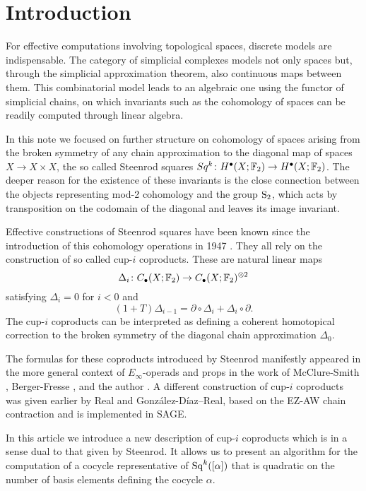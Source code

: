 
\section{Introduction}

For effective computations involving topological spaces, discrete models are indispensable.
The category of simplicial complexes models not only spaces but, through the simplicial approximation theorem, also continuous maps between them.
This combinatorial model leads to an algebraic one using the functor of simplicial chains, on which invariants such as the cohomology of spaces can be readily computed through linear algebra.

In this note we focused on further structure on cohomology of spaces arising from the broken symmetry of any chain approximation to the diagonal map of spaces $X \to X \times X$, the so called Steenrod squares $Sq^k \colon H^\bullet(X; \F_2) \to H^\bullet(X; \F_2)$.
The deeper reason for the existence of these invariants is the close connection between the objects representing mod-2 cohomology and the group $\S_2$, which acts by transposition on the codomain of the diagonal and leaves its image invariant.

Effective constructions of Steenrod squares have been known since the introduction of this cohomology operations in 1947 \cite{steenrod47}.
They all rely on the construction of so called cup-$i$ coproducts.
These are natural linear maps
\begin{equation*}
\Delta_i \colon \chains(X; \F_2)  \to \chains(X; \F_2)^{\otimes 2}
\end{equation*}
satisfying $\Delta_i = 0$ for $i < 0$ and
\begin{equation*}
(1 + T) \Delta_{i-1} = \partial \circ \Delta_i + \Delta_i \circ \partial.
\end{equation*}
The cup-$i$ coproducts can be interpreted as defining a coherent homotopical correction to the broken symmetry of the diagonal chain approximation $\Delta_0$.

The formulas for these coproducts introduced by Steenrod manifestly appeared in the more general context of $E_\infty$-operads and props in the work of McClure-Smith \cite{mcclure03cochain}, Berger-Fresse \cite{berger04combinatorial}, and the author \cite{medina2020prop1,medina2018prop2}.
A different construction of cup-$i$ coproducts was given earlier by Real and Gonz\'alez-D\'iaz--Real, based on the EZ-AW chain contraction and is implemented in SAGE.

In this article we introduce a new description of cup-$i$ coproducts which is in a sense dual to that given by Steenrod.
It allows us to present an algorithm for the computation of a cocycle representative of $\Sq^k([\alpha])$ that is quadratic on the number of basis elements defining the cocycle $\alpha$.

